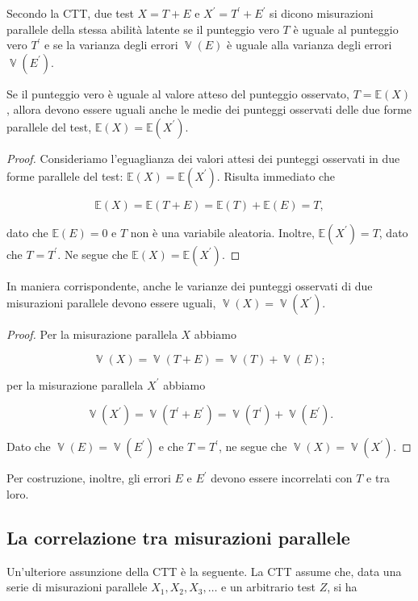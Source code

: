 \documentclass[
  11pt,
]{krantz}
\DeclareMathOperator{\V}{\mathbb{V}} %
\newcommand{\E}{\mathbb{E}} %
\theoremstyle{definition}
\theoremstyle{definition}
\theoremstyle{definition}
\theoremstyle{definition}
\theoremstyle{remark}
\begin{document}
Secondo la CTT, due test \(X=T+E\) e \(X^\prime=T^\prime+E^\prime\) si dicono misurazioni parallele della stessa abilità latente se il punteggio vero \(T\) è uguale al punteggio vero \(T^\prime\) e se la varianza degli errori \(\V(E)\) è uguale alla varianza degli errori \(\V(E^\prime)\).

Se il punteggio vero è uguale al valore atteso del punteggio osservato, \(T = \E(X)\), allora devono essere uguali anche le medie dei punteggi osservati delle due forme parallele del test, \(\E(X) = \E(X^\prime)\).

\begin{proof}
Consideriamo l'eguaglianza dei valori attesi dei punteggi osservati in due forme parallele del test: \(\E(X) = \E(X^\prime)\). Risulta immediato che

\[
\E(X) = \E(T + E) = \E(T) + \E(E) = T,
\]

dato che \(\E(E)=0\) e \(T\) non è una variabile aleatoria. Inoltre, \(\E(X^\prime)=T\), dato che \(T=T^\prime\). Ne segue che \(\E(X) =\E(X^\prime)\).
\end{proof}

In maniera corrispondente, anche le varianze dei punteggi osservati di due misurazioni parallele devono essere uguali, \(\V(X) = \V(X^\prime)\).

\begin{proof}
Per la misurazione parallela \(X\) abbiamo

\[
\V(X) = \V(T + E)=  \V(T) +  \V(E);
\]

per la misurazione parallela \(X^\prime\) abbiamo

\[
\V(X^\prime) = \V(T^\prime + E^\prime) =  \V(T^\prime) +  \V(E^\prime).
\]

Dato che \(\V(E)=\V(E^\prime)\) e che \(T=T^\prime\), ne segue che \(\V(X) =\V(X^\prime)\).
\end{proof}

Per costruzione, inoltre, gli errori \(E\) e \(E^\prime\) devono essere incorrelati con \(T\) e tra loro.

\hypertarget{la-correlazione-tra-misurazioni-parallele}{%
\subsection{La correlazione tra misurazioni parallele}\label{la-correlazione-tra-misurazioni-parallele}}

Un'ulteriore assunzione della CTT è la seguente. La CTT assume che, data una serie di misurazioni parallele \(X_1, X_2, X_3, \dots\) e un arbitrario test \(Z\), si ha
\end{document}
